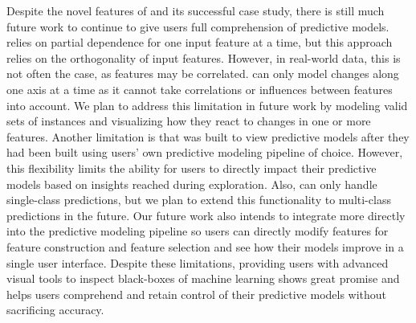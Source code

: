 Despite the novel features of \prospector and its successful case study, there is still much future work to continue to give users full comprehension of predictive models. \prospector relies on partial dependence for one input feature at a time, but this approach relies on the orthogonality of input features.  However, in real-world data, this is not often the case, as features may be correlated.  \prospector can only model changes along one axis at a time as it cannot take correlations or influences between features into account.
We plan to address this limitation in future work by modeling valid sets of instances and visualizing how
they react to changes in one or more features.  Another limitation is that \prospector was built to view predictive models after they had been built using users' own predictive modeling pipeline of choice.  However, this flexibility limits the ability for users to directly impact their predictive models based on insights reached during exploration. Also, \prospector can only handle single-class predictions, but we plan to extend this functionality to multi-class predictions in the future.
Our future work also intends to integrate \prospector more directly into the predictive modeling pipeline so users can directly modify features for feature construction and feature selection and see how their models improve in a single user interface.  Despite these limitations, providing users with advanced visual tools to inspect black-boxes of machine learning shows great promise and helps users comprehend and retain control of their predictive models without sacrificing accuracy.
